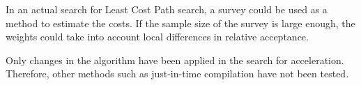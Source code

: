 \documentclass[acmtog]{acmart}
\begin{document}
	In an actual search for Least Cost Path search, a survey could be used as a method to estimate the costs.
	If the sample size of the survey is large enough, the
	weights could take  into account local differences in relative acceptance.
	
	Only changes in the algorithm have been applied in the search for acceleration.
	Therefore, other methods such as just-in-time compilation have not been tested.












\end{document}
